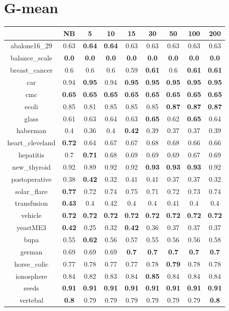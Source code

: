\documentclass{article}%
\begin{document}
%
\section*{G{-}mean}%
\begin{tabular}{c|cccccccc}%
\hline%
&NB&5&10&15&30&50&100&200\\%
\hline%
abalone16\_29&0.63&\textbf{0.64}&\textbf{0.64}&0.63&0.63&0.63&0.63&0.63\\%
\hline%
balance\_scale&\textbf{0.0}&\textbf{0.0}&\textbf{0.0}&\textbf{0.0}&\textbf{0.0}&\textbf{0.0}&\textbf{0.0}&\textbf{0.0}\\%
\hline%
breast\_cancer&0.6&0.6&0.6&0.59&\textbf{0.61}&0.6&\textbf{0.61}&\textbf{0.61}\\%
\hline%
car&0.94&\textbf{0.95}&0.94&\textbf{0.95}&\textbf{0.95}&\textbf{0.95}&\textbf{0.95}&\textbf{0.95}\\%
\hline%
cmc&\textbf{0.65}&\textbf{0.65}&\textbf{0.65}&\textbf{0.65}&\textbf{0.65}&\textbf{0.65}&\textbf{0.65}&\textbf{0.65}\\%
\hline%
ecoli&0.85&0.81&0.85&0.85&0.85&\textbf{0.87}&\textbf{0.87}&\textbf{0.87}\\%
\hline%
glass&0.61&0.63&0.64&0.63&\textbf{0.65}&0.62&\textbf{0.65}&0.64\\%
\hline%
haberman&0.4&0.36&0.4&\textbf{0.42}&0.39&0.37&0.37&0.39\\%
\hline%
heart\_cleveland&\textbf{0.72}&0.64&0.67&0.67&0.68&0.68&0.66&0.66\\%
\hline%
hepatitis&0.7&\textbf{0.71}&0.68&0.69&0.69&0.69&0.67&0.69\\%
\hline%
new\_thyroid&0.92&0.89&0.92&0.92&\textbf{0.93}&\textbf{0.93}&\textbf{0.93}&0.92\\%
\hline%
postoperative&0.38&\textbf{0.42}&0.32&0.41&0.41&0.37&0.37&0.32\\%
\hline%
solar\_flare&\textbf{0.77}&0.72&0.74&0.75&0.71&0.72&0.73&0.74\\%
\hline%
transfusion&\textbf{0.43}&0.4&0.42&0.4&0.4&0.41&0.4&0.4\\%
\hline%
vehicle&\textbf{0.72}&\textbf{0.72}&\textbf{0.72}&\textbf{0.72}&\textbf{0.72}&\textbf{0.72}&\textbf{0.72}&\textbf{0.72}\\%
\hline%
yeastME3&\textbf{0.42}&0.25&0.32&\textbf{0.42}&0.36&0.37&0.37&0.37\\%
\hline%
bupa&0.55&\textbf{0.62}&0.56&0.57&0.55&0.56&0.56&0.58\\%
\hline%
german&0.69&0.69&0.69&\textbf{0.7}&\textbf{0.7}&\textbf{0.7}&\textbf{0.7}&\textbf{0.7}\\%
\hline%
horse\_colic&0.77&0.78&0.77&0.77&0.78&\textbf{0.79}&0.78&0.78\\%
\hline%
ionosphere&0.84&0.82&0.83&0.84&\textbf{0.85}&0.84&0.84&0.84\\%
\hline%
seeds&\textbf{0.91}&\textbf{0.91}&\textbf{0.91}&\textbf{0.91}&\textbf{0.91}&\textbf{0.91}&\textbf{0.91}&\textbf{0.91}\\%
\hline%
vertebal&\textbf{0.8}&0.79&0.79&0.79&0.79&0.79&0.79&\textbf{0.8}\\%
\hline%
\end{tabular}

%
\end{document}
